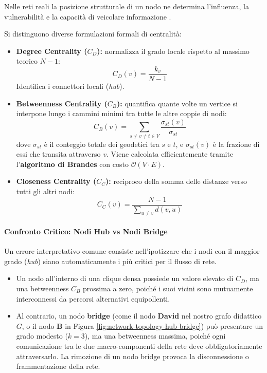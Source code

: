 Nelle reti reali la posizione strutturale di un nodo ne determina l'influenza, la vulnerabilità e la capacità di veicolare informazione \cite{barabasi2016}.

\begin{definition}
Si distinguono diverse formulazioni formali di centralità:
\begin{itemize}
    \item \textbf{Degree Centrality ($C_D$):} normalizza il grado locale rispetto al massimo teorico $N-1$:
    \begin{equation}
        C_D(v) = \frac{k_v}{N - 1}
    \end{equation}
    Identifica i connettori locali (\textit{hub}).
    \item \textbf{Betweenness Centrality ($C_B$):} quantifica quante volte un vertice si interpone lungo i cammini minimi tra tutte le altre coppie di nodi:
    \begin{equation}
        C_B(v) = \sum_{s \ne v \ne t \in V} \frac{\sigma_{st}(v)}{\sigma_{st}}
    \end{equation}
    dove $\sigma_{st}$ è il conteggio totale dei geodetici tra $s$ e $t$, e $\sigma_{st}(v)$ è la frazione di essi che transita attraverso $v$. Viene calcolata efficientemente tramite l'\textbf{algoritmo di Brandes} \cite{brandes2001} con costo $\mathcal{O}(V \cdot E)$.
    \item \textbf{Closeness Centrality ($C_C$):} reciproco della somma delle distanze verso tutti gli altri nodi:
    \begin{equation}
        C_C(v) = \frac{N - 1}{\sum_{u \ne v} d(v, u)}
    \end{equation}
\end{itemize}
\end{definition}

\paragraph{Confronto Critico: Nodi Hub vs Nodi Bridge}
Un errore interpretativo comune consiste nell'ipotizzare che i nodi con il maggior grado (\textit{hub}) siano automaticamente i più critici per il flusso di rete. 
\begin{itemize}
    \item Un nodo all'interno di una clique densa possiede un valore elevato di $C_D$, ma una betweenness $C_B$ prossima a zero, poiché i suoi vicini sono mutuamente interconnessi da percorsi alternativi equipollenti.
    \item Al contrario, un nodo \textbf{bridge} (come il nodo \textbf{David} nel nostro grafo didattico $G$, o il nodo \textbf{B} in Figura \ref{fig:network-topology-hub-bridge}) può presentare un grado modesto ($k = 3$), ma una betweenness massima, poiché ogni comunicazione tra le due macro-componenti della rete deve obbligatoriamente attraversarlo. La rimozione di un nodo bridge provoca la disconnessione o frammentazione della rete.
\end{itemize}

